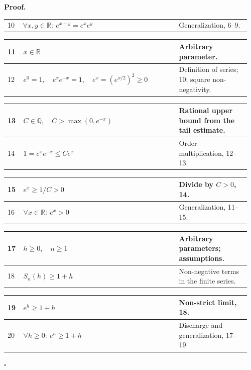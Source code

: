 \documentclass[11pt,reqno]{amsart}
\theoremstyle{redplain}
\renewcommand{\qedsymbol}{\textcolor{proofqed}{\ensuremath{\square}}}
\renewenvironment{proof}[1][Proof]{\par\noindent\textbf{\textcolor{proofhead}{#1.}}\par\nobreak}{\par\nobreak\hfill\qedsymbol}
\numberwithin{equation}{section}
\begin{document}
\begin{proof}
\begin{tabular}{|@{}p{0.06\linewidth}p{0.61\linewidth}p{0.29\linewidth}}
10 & $\forall x,y\in\mathbb{R}:\ e^{x+y}=e^xe^y$ & Generalization, 6--9. \\ 
\end{tabular}
\noindent \text{ \ }\newline
\noindent  
\begin{tabular}{|@{}p{0.06\linewidth}p{0.61\linewidth}p{0.29\linewidth}}
\hline
11 & $x\in\mathbb{R}$ & Arbitrary parameter. \\ \hline
12 & $e^0=1,\quad e^xe^{-x}=1,\quad e^x=(e^{x/2})^2\ge0$ & Definition of
series; 10; square non-negativity. \\ 
\end{tabular}%
\noindent \text{ \ }\newline
\noindent 
\begin{tabular}{|@{}p{0.06\linewidth}p{0.61\linewidth}p{0.29\linewidth}}
\hline
13 & $C\in\mathbb{Q},\quad C>\max(0,e^{-x})$ & Rational upper bound from the
tail estimate. \\ \hline
14 & $1=e^xe^{-x}\le Ce^x$ & Order multiplication, 12--13. \\ 
\end{tabular}%
\noindent \text{ \ }\newline
\noindent 
\begin{tabular}{|@{}p{0.06\linewidth}p{0.61\linewidth}p{0.29\linewidth}}
\hline
15 & $e^x\ge1/C>0$ & Divide by $C>0$, 14. \\ \hline
16 & $\forall x\in\mathbb{R}:\ e^x>0$ & Generalization, 11--15. \\ 
\end{tabular}%
\noindent \text{ \ }\newline
\noindent 
\begin{tabular}{|@{}p{0.06\linewidth}p{0.61\linewidth}p{0.29\linewidth}}
\hline
17 & $h\ge0,\quad n\ge1$ & Arbitrary parameters; assumptions. \\ \hline
18 & $S_n(h)\ge1+h$ & Non-negative terms in the finite series. \\ 
\end{tabular}%
\noindent \text{ \ }\newline
\noindent 
\begin{tabular}{|@{}p{0.06\linewidth}p{0.61\linewidth}p{0.29\linewidth}}
\hline
19 & $e^h\ge1+h$ & Non-strict limit, 18. \\ \hline
20 & $\forall h\ge0:\ e^h\ge1+h$ & Discharge and generalization, 17--19. \\ 
\hline
\end{tabular}%

\end{proof}
\end{document}

